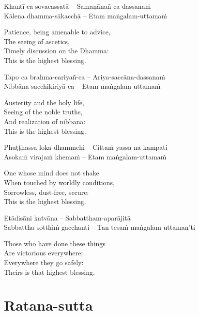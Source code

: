 Khantī ca sovacassatā – Samaṇānañ-ca dassanaṁ\\
Kālena dhamma-sākacchā – Etam maṅgalam-uttamaṁ

\begin{english-verses}
  Patience, being amenable to advice,\\
  The seeing of ascetics,\\
  Timely discussion on the Dhamma:\\
  This is the highest blessing.
\end{english-verses}

Tapo ca brahma-cariyañ-ca – Ariya-saccāna-dassanaṁ\\
Nibbāna-sacchikiriyā ca – Etam maṅgalam-uttamaṁ

\begin{english-verses}
  Austerity and the holy life,\\
  Seeing of the noble truths,\\
  And realization of nibbāna:\\
  This is the highest blessing.
\end{english-verses}

Phuṭṭhassa loka-dhammehi – Cittaṁ yassa na kampati\\
Asokaṁ virajaṁ khemaṁ – Etam maṅgalam-uttamaṁ

\begin{english-verses}
  One whose mind does not shake\\
  When touched by worldly conditions,\\
  Sorrowless, dust-free, secure:\\
  This is the highest blessing.
\end{english-verses}

Etādisāni katvāna – Sabbattham-aparājitā\\
Sabbattha sotthiṁ gacchanti – Tan-tesaṁ maṅgalam-uttaman'ti

\begin{english-verses}
  Those who have done these things\\
  Are victorious everywhere;\\
  Everywhere they go safely:\\
  Theirs is that highest blessing.
\end{english-verses}

\suttaRef{[Snp 2.4]}

\section{Ratana-sutta}
\label{ratana-sutta}

